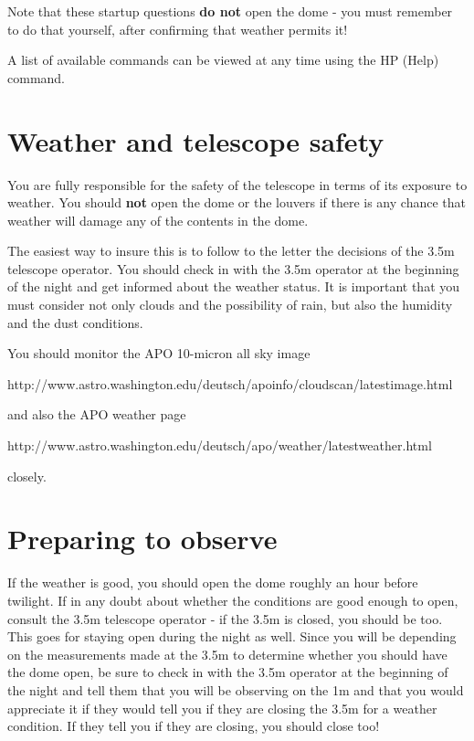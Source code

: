 \documentclass[10pt]{report}
\renewcommand{\[}{\begin{eqnarray}}
\renewcommand{\]}{\end{eqnarray}}
\begin{document}
Note that these startup questions \textbf{do not} open the dome - you
must remember to do that yourself, after confirming that weather permits
it!

A list of available commands can be viewed at any
time using the HP (Help) command.

\section{Weather and telescope safety}

You are fully responsible for the safety of the telescope in terms of
its exposure to weather. You should \textbf{not} open the dome or the
louvers if there is any chance that weather will damage any of the contents
in the dome. 

The easiest way to insure this is to follow to the letter the decisions
of the 3.5m telescope operator. You should check in with the 3.5m operator
at the beginning of the night and get informed about the weather status.
It is important that you must consider not only clouds and the possibility
of rain, but also the humidity and the dust conditions.

You should monitor the APO 10-micron all sky image 
\begin{center}
http://www.astro.washington.edu/deutsch/apoinfo/cloudscan/latestimage.html
\end{center}
and also the APO weather page 
\begin{center}
http://www.astro.washington.edu/deutsch/apo/weather/latestweather.html
\end{center}
closely.


\section{Preparing to observe}

If the weather is good, you should open the dome roughly an hour before
twilight. If in any doubt about whether the conditions are good enough
to open, consult the 3.5m telescope operator - if the 3.5m is closed,
you should be too.  This goes for staying open during the night as well.
Since you will be depending on the measurements made at the 3.5m to 
determine whether you should have the dome open, be sure to check in with
the 3.5m operator at the beginning of the night and tell them that you
will be observing on the 1m and that you would appreciate it if they
would tell you if they are closing the 3.5m for a weather condition. 
If they tell you if they are closing, you should close too!
\end{document}
